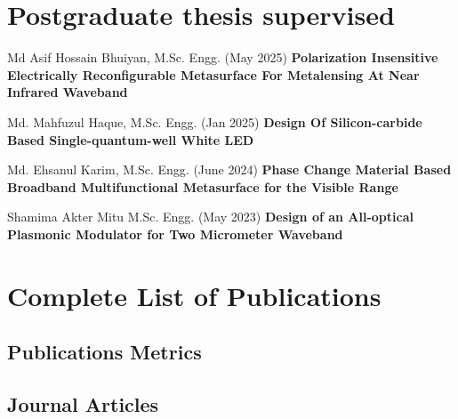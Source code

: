 \documentclass[cvauthor={Dr. Sajid Muhaimin Choudhury}]{buetcv}
\begin{document}







\section{Postgraduate thesis supervised}
\vspace{0.2 cm}
\begin{highlights}
\item Md Asif Hossain Bhuiyan, M.Sc. Engg. (May 2025) \textbf{Polarization Insensitive Electrically Reconfigurable Metasurface For Metalensing At Near Infrared Waveband}
\item Md. Mahfuzul Haque,  M.Sc. Engg. (Jan 2025) \textbf{Design Of Silicon-carbide Based Single-quantum-well White LED}
\item Md. Ehsanul Karim, M.Sc. Engg. (June 2024) \textbf{Phase Change Material Based Broadband Multifunctional Metasurface for the Visible Range}
\item Shamima Akter Mitu M.Sc. Engg. (May 2023) \textbf{Design of an All-optical Plasmonic Modulator for Two Micrometer Waveband}
\end{highlights}        
\section{Complete List of Publications}
\vspace{0.2 cm}
\subsection{Publications Metrics}

\vspace{0.2 cm}   
\subsection{Journal Articles}
\nocite{*}
\newrefcontext[labelprefix=J]
\printbibliography[env=counter,type=article,heading=none]
  \printbibliography[type=article,heading=none]
  
\end{document}
